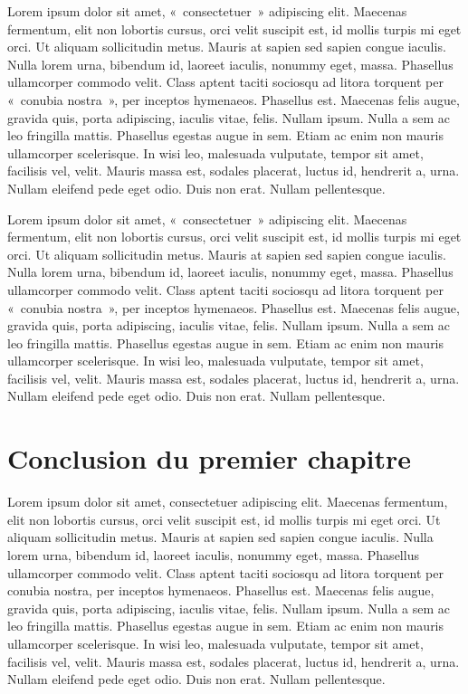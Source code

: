 Lorem ipsum dolor sit amet, «~consectetuer~» adipiscing elit. Maecenas fermentum, elit non lobortis cursus, orci velit suscipit est, id mollis turpis mi eget orci. Ut aliquam sollicitudin metus. Mauris at sapien sed sapien congue iaculis. Nulla lorem urna, bibendum id, laoreet iaculis, nonummy eget, massa. Phasellus ullamcorper commodo velit. Class aptent taciti sociosqu ad litora torquent per «~conubia nostra~», per inceptos hymenaeos. Phasellus est. Maecenas felis augue, gravida quis, porta adipiscing, iaculis vitae, felis. Nullam ipsum. Nulla a sem ac leo fringilla mattis. Phasellus egestas augue in sem. Etiam ac enim non mauris ullamcorper scelerisque. In wisi leo, malesuada vulputate, tempor sit amet, facilisis vel, velit. Mauris massa est, sodales placerat, luctus id, hendrerit a, urna. Nullam eleifend pede eget odio. Duis non erat. Nullam pellentesque.

Lorem ipsum dolor sit amet, «~consectetuer~» adipiscing elit. Maecenas fermentum, elit non lobortis cursus, orci velit suscipit est, id mollis turpis mi eget orci. Ut aliquam sollicitudin metus. Mauris at sapien sed sapien congue iaculis. Nulla lorem urna, bibendum id, laoreet iaculis, nonummy eget, massa. Phasellus ullamcorper commodo velit. Class aptent taciti sociosqu ad litora torquent per «~conubia nostra~», per inceptos hymenaeos. Phasellus est. Maecenas felis augue, gravida quis, porta adipiscing, iaculis vitae, felis. Nullam ipsum. Nulla a sem ac leo fringilla mattis. Phasellus egestas augue in sem. Etiam ac enim non mauris ullamcorper scelerisque. In wisi leo, malesuada vulputate, tempor sit amet, facilisis vel, velit. Mauris massa est, sodales placerat, luctus id, hendrerit a, urna. Nullam eleifend pede eget odio. Duis non erat. Nullam pellentesque.


\section{Conclusion du premier chapitre}


Lorem ipsum dolor sit amet, consectetuer adipiscing elit. Maecenas fermentum, elit non lobortis cursus, orci velit suscipit est, id mollis turpis mi eget orci. Ut aliquam sollicitudin metus. Mauris at sapien sed sapien congue iaculis. Nulla lorem urna, bibendum id, laoreet iaculis, nonummy eget, massa. Phasellus ullamcorper commodo velit. Class aptent taciti sociosqu ad litora torquent per conubia nostra, per inceptos hymenaeos. Phasellus est. Maecenas felis augue, gravida quis, porta adipiscing, iaculis vitae, felis. Nullam ipsum. Nulla a sem ac leo fringilla mattis. Phasellus egestas augue in sem. Etiam ac enim non mauris ullamcorper scelerisque. In wisi leo, malesuada vulputate, tempor sit amet, facilisis vel, velit. Mauris massa est, sodales placerat, luctus id, hendrerit a, urna. Nullam eleifend pede eget odio. Duis non erat. Nullam pellentesque.

